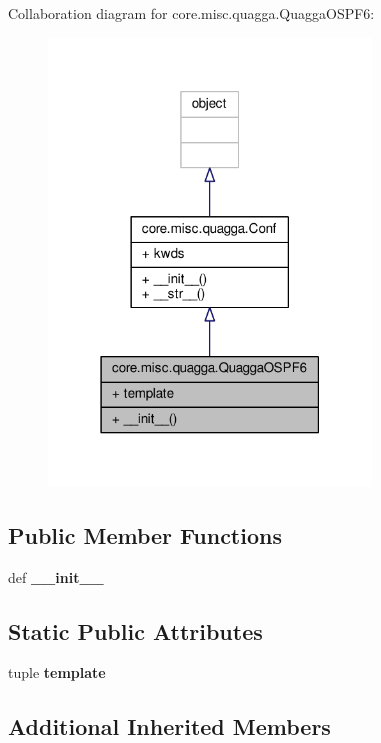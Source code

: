 Collaboration diagram for core.\+misc.\+quagga.\+Quagga\+O\+S\+P\+F6\+:
\nopagebreak
\begin{figure}[H]
\begin{center}
\leavevmode
\includegraphics[width=243pt]{classcore_1_1misc_1_1quagga_1_1_quagga_o_s_p_f6__coll__graph}
\end{center}
\end{figure}
\subsection*{Public Member Functions}
\begin{DoxyCompactItemize}
\item 
\hypertarget{classcore_1_1misc_1_1quagga_1_1_quagga_o_s_p_f6_a5cac506c34ad9e20dbdca44db04ae877}{def {\bfseries \+\_\+\+\_\+init\+\_\+\+\_\+}}\label{classcore_1_1misc_1_1quagga_1_1_quagga_o_s_p_f6_a5cac506c34ad9e20dbdca44db04ae877}

\end{DoxyCompactItemize}
\subsection*{Static Public Attributes}
\begin{DoxyCompactItemize}
\item 
tuple {\bfseries template}
\end{DoxyCompactItemize}
\subsection*{Additional Inherited Members}



